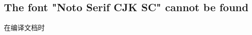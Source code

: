 \documentclass[../../../dolphin-book-2023.tex]{subfiles}
\begin{document}
\subsection{The font "Noto Serif CJK SC" cannot be found}

在编译文档时
\end{document}
